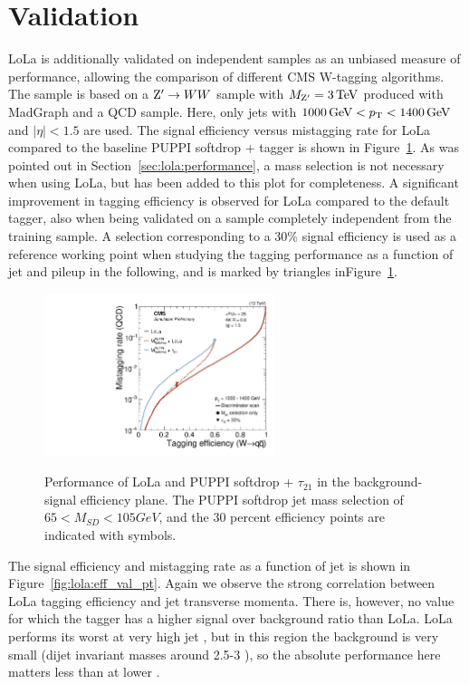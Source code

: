 \section{Validation}
\label{sec:validation}
LoLa is additionally validated on independent samples as an unbiased measure of performance, allowing the comparison of different CMS W-tagging algorithms. The sample is based on a $\mathrm{Z}^\prime \rightarrow WW$ sample with $M_{\mathrm{Z}^\prime}=3\,\text{Te\hspace{-.08em}V}$ produced with MadGraph and a QCD  sample. Here, only jets with $ 1000 \,\text{Ge\hspace{-.08em}V} < p_{\mathrm{T}} < 1400 \,\text{Ge\hspace{-.08em}V}$ and $|\eta| < 1.5$ are used. The signal efficiency versus mistagging rate for LoLa compared to the baseline PUPPI softdrop + \nsubj tagger is shown in Figure~\ref{fig:roc_val}. As was pointed out in Section~\ref{sec:lola:performance}, a mass selection is not necessary when using LoLa, but has been added to this plot for completeness. A significant improvement in tagging efficiency is observed for LoLa compared to the default tagger, also when being validated on a sample completely independent from the training sample. A selection corresponding to a 30\% signal efficiency is used as a reference working point when studying the tagging performance as a function of jet \PT and pileup in the following, and is marked by triangles inFigure~\ref{fig:roc_val}.
\begin{figure}[h!]
\centering
\includegraphics[width=0.6\textwidth]{figures/vtagging/AN-18-099/validation/roc_ZpWqqvsQCD.pdf}\\
\caption{Performance of LoLa and PUPPI softdrop + $\tau_{21}$ in the background-signal efficiency plane. The PUPPI softdrop jet mass
selection of $65 < M_{SD} < 105 GeV$, and the 30 percent efficiency points are indicated with symbols.}
\label{fig:roc_val}
\end{figure}
The signal efficiency and mistagging rate as a function of jet \PT is shown in Figure~\ref{fig:lola:eff_val_pt}. Again we observe the strong correlation between LoLa tagging efficiency and jet transverse momenta. There is, however, no value for which the \nsubj tagger has a higher signal over background ratio than LoLa. LoLa performs its worst at very high jet \PT, but in this region the background is very small (dijet invariant masses around 2.5-3 \TeV), so the absolute performance here matters less than at lower \PT.
